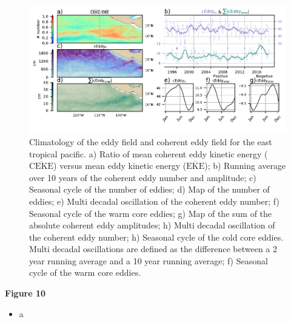 \documentclass[draft,linenumbers]{agujournal2019}
\newcommand{\MEKE}{\overline{\textrm{EKE}}}
\newcommand{\MCEKE}{\overline{\textrm{CEKE}}}
\begin{document}
	\begin{figure}
	    \centering
	    \includegraphics[width=1\textwidth]{figures/regional_ratios_and_stats_V3_3.pdf}
	    \caption{Climatology of the eddy field and coherent eddy field for the east tropical pacific. a) Ratio of mean coherent eddy kinetic energy ($\MCEKE$) versus mean eddy kinetic energy ($\MEKE$); b) Running average over 10 years of the coherent eddy number and amplitude; c) Seasonal cycle of the number of eddies; d) Map of the number of eddies; 
		e) Multi decadal oscillation of the coherent eddy number; f) Seasonal cycle of the warm core eddies; g) Map of the sum of the absolute coherent eddy amplitudes;  h) Multi decadal oscillation of the coherent eddy number; h) Seasonal cycle of the cold core eddies. Multi decadal oscillations are defined as the difference between a 2 year running average and a 10 year running average; f) Seasonal cycle of the warm core eddies.}
	    \label{fig:south_atlantic_cycle}
	\end{figure}

	\textbf{Figure 10}
	\begin{itemize}
		\item a
	\end{itemize}
\end{document}
